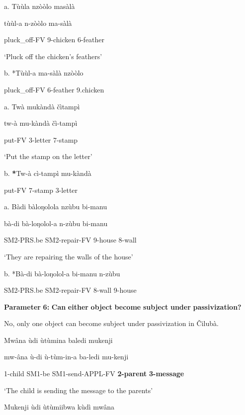 \documentclass[output=paper]{langscibook}
\begin{document}
            a.  Tùùla          nzòòlo    masàlà

      tùùl-a        n-zòòlo    ma-sàlà

pluck\_off-FV    9-chicken  6-feather

\glt ‘Pluck off the chicken’s feathers’

    b. *Tùùl-a        ma-sàlà    nzòòlo

  pluck\_off-FV    6-feather  9.chicken

\ea%
    \label{ex:lukusa:48}
    \z

           a.  Twà    mukàndà    {č}ìtampì

      tw-à    mu-kàndà    {č}ì-tampì

put-FV  3-letter      7-stamp

\glt ‘Put the stamp on the letter’

    b.  \textbf{*}Tw-à    cì-tampì    mu-kàndà

  put-FV    7-stamp   3-letter

\ea%
    \label{ex:lukusa:49}
    \z

          a.  Bàdi        bàloŋolola      nzùbu    bi-manu

      bà-di        bà-loŋolol-a    n-zùbu    bi-manu

SM2-PRS.be  SM2-repair-FV    9-house    8-wall

\glt ‘They are repairing the walls of the house’

    b.  *Bà-di      bà-loŋolol-a    bi-manu    n-zùbu

  SM2-PRS.be  SM2-repair-FV    8-wall    9-house

\textbf{Parameter} \textbf{6:} \textbf{Can} \textbf{either} \textbf{object} \textbf{become} \textbf{subject} \textbf{under} \textbf{passivization?}

No, only one object can become subject under passivization in Čilubà.

\ea%
    \label{ex:lukusa:50}
    \z

          Mwâna    ùdi    ùtùmina          baledi    mukenji

    mw-âna    ù-di    ù-tùm-in-a        ba-ledi    mu-kenji

1-child    SM1-be  SM1-send-APPL-FV  \textbf{2-parent}  \textbf{3-message}

\glt ‘The child is sending the message to the parents’

\ea%
    \label{ex:lukusa:51}
    \z

          Mukenji      ùdi        ùtùmiibwa        kùdì  mwâna
\end{document}
